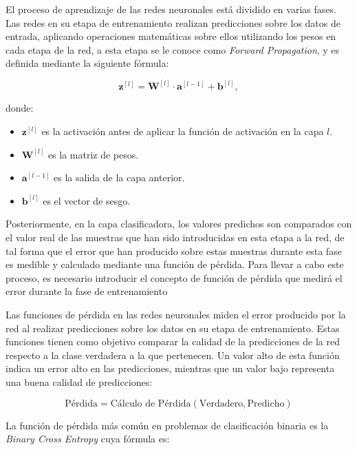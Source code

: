 \documentclass{uathesis-es}
\begin{document}
	
	El proceso de aprendizaje de las redes neuronales está dividido en varias fases. Las redes en su etapa de entrenamiento realizan predicciones sobre los datos de entrada, aplicando operaciones matemáticas sobre ellos utilizando los pesos en cada etapa de la red, a esta etapa se le conoce como \textit{Forward Propagation}, y es definida mediante la siguiente fórmula:
	
	
	\[
	\mathbf{z}^{[l]} = \mathbf{W}^{[l]} \cdot \mathbf{a}^{[l-1]} + \mathbf{b}^{[l]},
	\]
	
	donde:
	\begin{itemize}
		\item \(\mathbf{z}^{[l]}\) es la activación antes de aplicar la función de activación en la capa \(l\).
		\item \(\mathbf{W}^{[l]}\) es la matriz de pesos.
		\item \(\mathbf{a}^{[l-1]}\) es la salida de la capa anterior.
		\item \(\mathbf{b}^{[l]}\) es el vector de sesgo.
	\end{itemize}
	
	Posteriormente, en la capa clasificadora, los valores predichos son comparados con el valor real de las muestras que han sido introducidas en esta etapa a la red, de tal forma que el error que han producido sobre estas muestras durante esta fase es medible y calculado mediante una función de pérdida. Para llevar a cabo este proceso, es necesario introducir el concepto de función de pérdida que medirá el error durante la fase de entrenamiento
	
	
	
	Las funciones de pérdida en las redes neuronales miden el error producido por la red al realizar predicciones sobre los datos en su etapa de entrenamiento. Estas funciones tienen como objetivo comparar la calidad de la predicciones de la red respecto a la clase verdadera a la que pertenecen. Un valor alto de esta función indica un error alto en las predicciones, mientras que un valor bajo representa una buena calidad de predicciones:
	
	\[
	\text{Pérdida} = \text{Cálculo de Pérdida} (\text{Verdadero}, \text{Predicho})
	\]
	
	La función de pérdida más común en problemas de clasificación binaria es la \textit{Binary Cross Entropy} cuya fórmula es:
	
\end{document}
